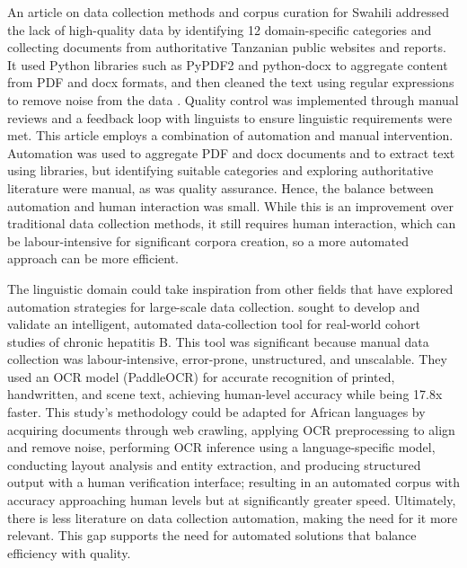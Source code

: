 \documentclass[12pt]{ThesisRU}
\begin{document}
\vspace{1em}
An article on data collection methods and corpus curation for Swahili addressed the lack of high-quality data by identifying 12 domain-specific categories and collecting documents from authoritative Tanzanian public websites and reports. It used Python libraries such as PyPDF2 and python-docx to aggregate content from PDF and docx formats, and then cleaned the text using regular expressions to remove noise from the data \citep{Masua2024}. Quality control was implemented through manual reviews and a feedback loop with linguists to ensure linguistic requirements were met. This article employs a combination of automation and manual intervention. Automation was used to aggregate PDF and docx documents and to extract text using libraries, but identifying suitable categories and exploring authoritative literature were manual, as was quality assurance. Hence, the balance between automation and human interaction was small. While this is an improvement over traditional data collection methods, it still requires human interaction, which can be labour-intensive for significant corpora creation, so a more automated approach can be more efficient.

The linguistic domain could take inspiration from other fields that have explored automation strategies for large-scale data collection. \citet{Zhou2024} sought to develop and validate an intelligent, automated data-collection tool for real-world cohort studies of chronic hepatitis B. This tool was significant because manual data collection was labour-intensive, error-prone, unstructured, and unscalable. They used an OCR model (PaddleOCR) for accurate recognition of printed, handwritten, and scene text, achieving human-level accuracy while being 17.8x faster. This study's methodology could be adapted for African languages by acquiring documents through web crawling, applying OCR preprocessing to align and remove noise, performing OCR inference using a language-specific model, conducting layout analysis and entity extraction, and producing structured output with a human verification interface; resulting in an automated corpus with accuracy approaching human levels but at significantly greater speed. Ultimately, there is less literature on data collection automation, making the need for it more relevant. This gap supports the need for automated solutions that balance efficiency with quality. 
\end{document}
